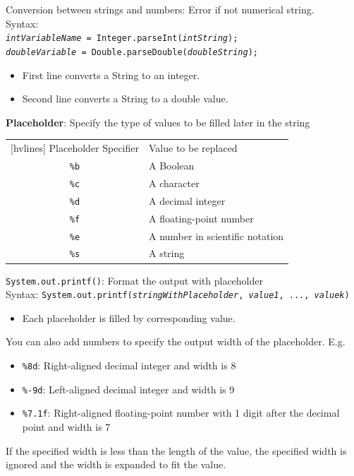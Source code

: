 \documentclass{article}
\begin{document}
Conversion between strings and numbers: Error if not numerical string.\\
Syntax:\\
\texttt{\textit{intVariableName} = Integer.parseInt(\textit{intString});\\
\textit{doubleVariable} = Double.parseDouble(\textit{doubleString});}
\begin{itemize}
	\item First line converts a String to an integer.
	\item Second line converts a String to a double value.
\end{itemize}

\textbf{Placeholder}: Specify the type of values to be filled later in the string

\begin{table}[h!]
	\centering
	\begin{NiceTabular}{||cl||}[hvlines]
		\RowStyle{\bfseries} Placeholder Specifier & Value to be replaced\\
		\texttt{{\%}b} & A Boolean\\
		\texttt{{\%}c} & A character\\
		\texttt{{\%}d} & A decimal integer\\
		\texttt{{\%}f} & A floating-point number\\
		\texttt{{\%}e} & A number in scientific notation\\
		\texttt{{\%}s} & A string
	\end{NiceTabular}
\end{table}

\texttt{System.out.printf()}: Format the output with placeholder\\
Syntax: \texttt{System.out.printf(\textit{stringWithPlaceholder}, \textit{value1}, ..., \textit{valuek})}
\begin{itemize}
	\item Each placeholder is filled by corresponding value. 
\end{itemize}
You can also add numbers to specify the output width of the placeholder. E.g.
\begin{itemize}
	\item \texttt{{\%}8d}: Right-aligned decimal integer and width is 8
	\item \texttt{{\%}-9d}: Left-aligned decimal integer and width is 9
	\item \texttt{{\%}7.1f}: Right-aligned floating-point number with 1 digit after the decimal point and width is 7
\end{itemize}
If the specified width is less than the length of the value, the specified width is ignored and the width is expanded to fit the value.
\newpage
\end{document}
